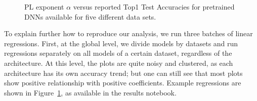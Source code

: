 \begin{figure}[t]
{        \label{fig:svhn.alpha}
    }
    \qquad
    \caption{%
             PL exponent $\alpha$ versus reported Top1 Test Accuracies for pretrained DNNs available for five different data sets.
            }
    \label{fig:DSalphas}
\end{figure}

To explain further how to reproduce our analysis, we run three batches of linear regressions. 
First, at the global level, we divide models by datasets and run regressions separately on all models of a certain dataset, regardless of the architecture. 
At this level, the plots are quite noisy and clustered, as each architecture has its own accuracy trend; but one can
 still see that most plots show positive relationship with positive coefficients. 
Example regressions are shown in Figure~\ref{fig:DSalphas}, as available in the results notebook.
 
